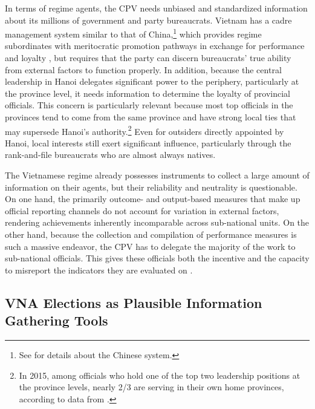 \documentclass[12pt]{article}
\newcommand{\1}{\mathbbm{1}}
\begin{document}
In terms of regime agents, the CPV needs unbiased and standardized information about its millions of government and party bureaucrats. Vietnam has a cadre management system similar to that of China,\footnote{See \citet{Manion1985} for details about the Chinese system.} which provides regime subordinates with meritocratic promotion pathways in exchange for performance and loyalty \citep{Svolik2012}, but requires that the party can discern bureaucrats' true ability from external factors to function properly. In addition, because the central leadership in Hanoi delegates significant power to the periphery, particularly at the province level, it needs information to determine the loyalty of provincial officials. This concern is particularly relevant because most top officials in the provinces tend to come from the same province and have strong local ties that may supersede Hanoi's authority.\footnote{In 2015, among officials who hold one of the top two leadership positions at the province levels, nearly 2/3 are serving in their own home provinces, according to data from \citet{MaleskyPhan2017}.} Even for outsiders directly appointed by Hanoi, local interests still exert significant influence, particularly through the rank-and-file bureaucrats who are almost always natives. 

The Vietnamese regime already possesses instruments to collect a large amount of information on their agents, but their reliability and neutrality is questionable. On one hand, the primarily outcome- and output-based measures that make up official reporting channels do not account for variation in external factors, rendering achievements inherently incomparable across sub-national units. On the other hand, because the collection and compilation of performance measures is such a massive endeavor, the CPV has to delegate the majority of the work to sub-national officials. This gives these officials both the incentive and the capacity to misreport the indicators they are evaluated on \citep[][Ch. 8]{JensenMalesky2018}.

\subsection{VNA Elections as Plausible Information Gathering Tools}
\end{document}
